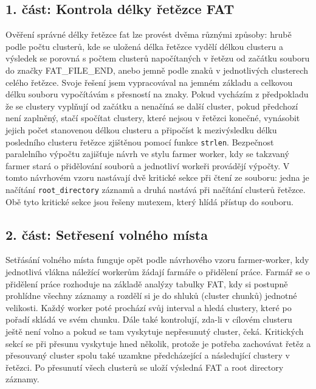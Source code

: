 \documentclass[12pt,a4paper]{article}
\begin{document}
\subsection{1. část: Kontrola délky řetězce FAT}
Ověření správné délky řetězce fat lze provést dvěma různými způsoby: hrubě podle počtu clusterů, kde se uložená délka řetězce vydělí délkou clusteru a výsledek se porovná s počtem clusterů napočítaných v řetězu od začátku souboru do značky FAT\_FILE\_END, anebo jemně podle znaků v jednotlivých clusterech celého řetězce. Svoje řešení jsem vypracovával na jemném základu a celkovou délku souboru vypočítávám s přesností na znaky. Pokud vycházím z předpokladu že se clustery vyplňují od začátku a nenačíná se další cluster, pokud předchozí není zaplněný, stačí spočítat clustery, které nejsou v řetězci konečné, vynásobit jejich počet stanovenou délkou clusteru a připočíst k mezivýsledku délku posledního clusteru řetězce zjištěnou pomocí funkce \texttt{strlen}.
Bezpečnost paralelního výpočtu zajišťuje návrh ve stylu farmer worker, kdy se takzvaný farmer stará o přidělování souborů a jednotliví workeři provádějí výpočty. V tomto návrhovém vzoru nastávají dvě kritické sekce při čtení ze souboru: jedna je načítání \texttt{root\_directory} záznamů a druhá nastává při načítání clusterů řetězce. Obě tyto kritické sekce jsou řešeny mutexem, který hlídá přístup do souboru.
\newpage
\subsection{2. část: Setřesení volného místa}
Setřásání volného místa funguje opět podle návrhového vzoru farmer-worker, kdy jednotlivá vlákna náležící workerům žádají farmáře o přidělení práce. Farmář se o přidělení práce rozhoduje na základě analýzy tabulky FAT, kdy si postupně prohlídne všechny záznamy a rozdělí si je do shluků (cluster chunků) jednotné velikosti. Každý worker poté prochází svůj interval a hledá clustery, které po pořadí skládá ve svém chunku. Dále také kontrolují, zda-li v cílovém clusteru ještě není volno a pokud se tam vyskytuje nepřesunutý cluster, čeká. Kritických sekcí se při přesunu vyskytuje hned několik, protože je potřeba zachovávat řetěz a přesouvaný cluster spolu také uzamkne předcházející a následující clustery v řetězci. Po přesunutí všech clusterů se uloží výsledná FAT a root directory záznamy.
\end{document}
